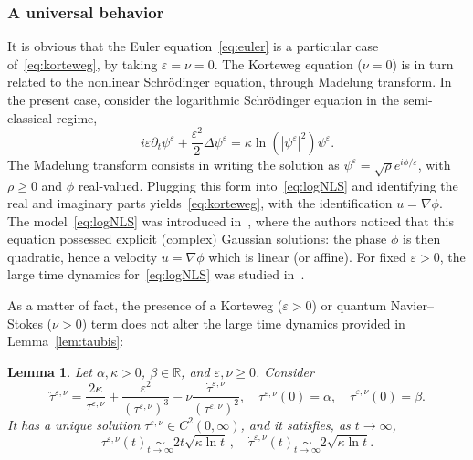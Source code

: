\documentclass[11pt]{article}
\newtheorem{lemm}[theo]{Lemma}
\theoremstyle{definition}
\numberwithin{equation}{section}
\numberwithin{figure}{section}
\numberwithin{table}{section}
\newcommand*\R{\mathbb{R}}
\newcommand*\<{\left\langle}
\renewcommand*\>{\right\rangle}
\renewcommand*\ge{\geqslant}
\newcommand*\Eq[2]{\mathop{\sim}\limits_{#1\rightarrow#2}}
\newcommand*\eps{\varepsilon}
\begin{document}
\subsubsection{A universal behavior}

It is obvious that the Euler equation~\eqref{eq:euler} is a particular case of~\eqref{eq:korteweg}, by taking $\eps=\nu=0$. The Korteweg equation ($\nu=0$) is in turn related to the nonlinear Schr\"odinger equation, through Madelung transform. In the present case, consider the logarithmic Schr\"odinger equation in the semi-classical regime,
\begin{equation}\label{eq:logNLS}
i\eps\partial_t \psi^\eps +\frac{\eps^2}{2} \Delta \psi^\eps =\kappa
\ln\left(|\psi^\eps|^2\right)\psi^\eps.
\end{equation}
The Madelung transform consists in writing the solution as $\psi^\eps=\sqrt\rho e^{i\phi/\eps}$, with $\rho\ge 0$ and $\phi$ real-valued. Plugging this form into~\eqref{eq:logNLS} and identifying the real and imaginary parts yields~\eqref{eq:korteweg}, with the identification $u=\nabla \phi$. The model~\eqref{eq:logNLS} was introduced in~\cite{BiMy76}, where the authors noticed that this equation possessed explicit (complex) Gaussian solutions: the phase $\phi$ is then quadratic, hence a velocity $u=\nabla \phi$ which is linear (or affine). For fixed $\eps>0$, the large time dynamics for~\eqref{eq:logNLS} was studied in~\cite{CaGa18}.

As a matter of fact, the presence of a Korteweg ($\eps>0$) or quantum Navier--Stokes ($\nu>0$) term does not alter the large time dynamics provided in Lemma~\ref{lem:taubis}:

\begin{lemm}\label{lem:ODE2}
Let $\alpha,\kappa>0$, $\beta\in \R$, and $\eps,\nu\ge 0$. Consider
\begin{equation}\label{eq:tau-quant}
\ddot \tau^{\eps,\nu} =
\frac{2\kappa }{\tau^{\eps,\nu}}+\frac{\eps^2}{(\tau^{\eps,\nu})^3}-\nu
\frac{\dot \tau^{\eps,\nu}}{(\tau^{\eps,\nu})^2},\quad
\tau^{\eps,\nu}(0)=\alpha,\quad \dot \tau^{\eps,\nu}(0)=\beta.
\end{equation}
It has a unique solution $\tau^{\eps,\nu}\in C^2(0,\infty)$, and it satisfies, as $t\to \infty$,
\begin{equation*}
\tau^{\eps,\nu}(t)\Eq t \infty 2t \sqrt{\kappa \ln t} \,,\quad \dot
\tau^{\eps,\nu}(t)\Eq t \infty 2\sqrt{\kappa\ln t}.
\end{equation*}
\end{lemm}
\end{document}
